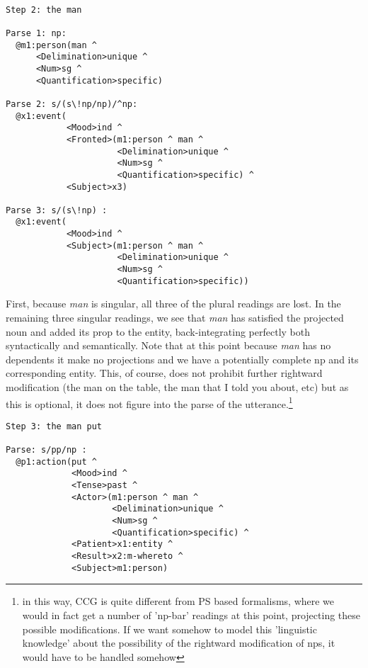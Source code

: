 \begin{verbatim}

Step 2: the man

Parse 1: np: 
  @m1:person(man ^
      <Delimination>unique ^ 
      <Num>sg ^ 
      <Quantification>specific)

Parse 2: s/(s\!np/np)/^np: 
  @x1:event(
            <Mood>ind ^ 
            <Fronted>(m1:person ^ man ^ 
                      <Delimination>unique ^ 
                      <Num>sg ^ 
                      <Quantification>specific) ^ 
            <Subject>x3)

Parse 3: s/(s\!np) : 
  @x1:event(
            <Mood>ind ^ 
            <Subject>(m1:person ^ man ^ 
                      <Delimination>unique ^ 
                      <Num>sg ^ 
                      <Quantification>specific))
\end{verbatim}
First, because \emph{man} is singular, all three of the plural readings are lost. In the remaining three singular readings, we see that \emph{man} has satisfied the projected noun and added its prop to the entity, back-integrating perfectly both syntactically and semantically. Note that at this point because \emph{man}  has no dependents it make no projections and we have a potentially complete np and its corresponding entity. This, of course, does not prohibit further rightward modification (the man on the table, the man that I told you about, etc) but as this is optional, it does not figure into the parse of the utterance.\footnote{in this way, CCG is quite different from PS based formalisms, where we would in fact get a number of 'np-bar' readings at this point, projecting these possible modifications. If we want somehow to model this 'linguistic knowledge' about the possibility of the rightward modification of nps, it would have to be handled somehow}
\begin{verbatim}
Step 3: the man put

Parse: s/pp/np : 
  @p1:action(put ^ 
             <Mood>ind ^ 
             <Tense>past ^ 
             <Actor>(m1:person ^ man ^ 
                     <Delimination>unique ^ 
                     <Num>sg ^ 
                     <Quantification>specific) ^ 
             <Patient>x1:entity ^ 
             <Result>x2:m-whereto ^ 
             <Subject>m1:person)
\end{verbatim}
